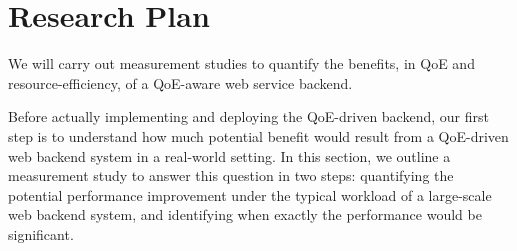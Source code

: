 \section{Research Plan}

\label{sec:quantifying}
\begin{task}
We will carry out measurement studies to quantify the benefits, in QoE and resource-efficiency, of a QoE-aware web service backend.
\end{task}

Before actually implementing and deploying the QoE-driven backend, our first step is to understand how much potential benefit would result from a QoE-driven web backend system in a real-world setting. 
In this section, we outline a measurement study to answer this question in two steps: quantifying the potential performance improvement under the typical workload of a large-scale web backend system, and identifying when exactly the performance would be significant.



